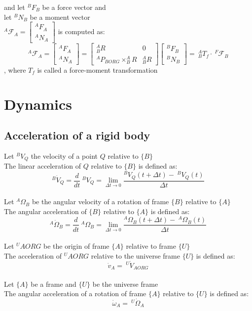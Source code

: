 \documentclass[10pt,a4paper]{article}
\newcommand{\vect}[1]{\ensuremath{\begin{bmatrix}#1\end{bmatrix}}}
\begin{document}
and let $^BF_B$ be a force vector and \\
let $^BN_B$ be a moment vector \\
$^A\mathcal{F}_A = \vect{^AF_A \\ ^AN_A}$ is computed as:
$$
	^A\mathcal{F}_A = \vect{^AF_A \\ ^AN_A} = \begin{bmatrix}
		^A_BR & 0 \\
		^AP_{BORG} \times ^A_BR & ^A_BR
	\end{bmatrix} \vect{^BF_B \\ ^BN_B} = ~^A_BT_f ⋅ ~^F\mathcal{F}_B
$$
, where $T_f$ is called a force-moment transformation

\section{Dynamics}
\subsection{Acceleration of a rigid body}
Let $^BV_Q$ the velocity of a point $Q$ relative to $\{B\}$ \\
The linear acceleration of $Q$ relative to $\{B\}$ is defined as:
$$
	^B\dot V_Q = \frac d {dt} ~^BV_Q = \lim_{\Delta t → 0} \frac{^BV_Q(t + \Delta t) - ~^BV_Q(t)}{\Delta t}
$$
\\

Let $^A\Omega_B$ be the angular velocity of a rotation of frame $\{B\}$ relative to $\{A\}$ \\
The angular acceleration of $\{B\}$ relative to $\{A\}$ is defined as:
$$
	^A\dot \Omega_B = \frac d {dt} ~^A\Omega_B = \lim_{\Delta t → 0} \frac{^A\Omega_B(t + \Delta t) - ~^A\Omega_B(t)}{\Delta t}
$$
\\

Let $^UAORG$ be the origin of frame $\{A\}$ relative to frame $\{U\}$ \\
The acceleration of $^UAORG$ relative to the universe frame $\{U\}$ is defined as:
$$
\dot v_A = ~^U\dot V_{AORG}
$$
\\

Let $\{A\}$ be a frame and $\{U\}$ be the universe frame \\
The angular acceleration of a rotation of frame $\{A\}$ relative to $\{U\}$ is defined as:
$$
\dot \omega_A = ~^U \dot \Omega_{A}
$$
\end{document}
